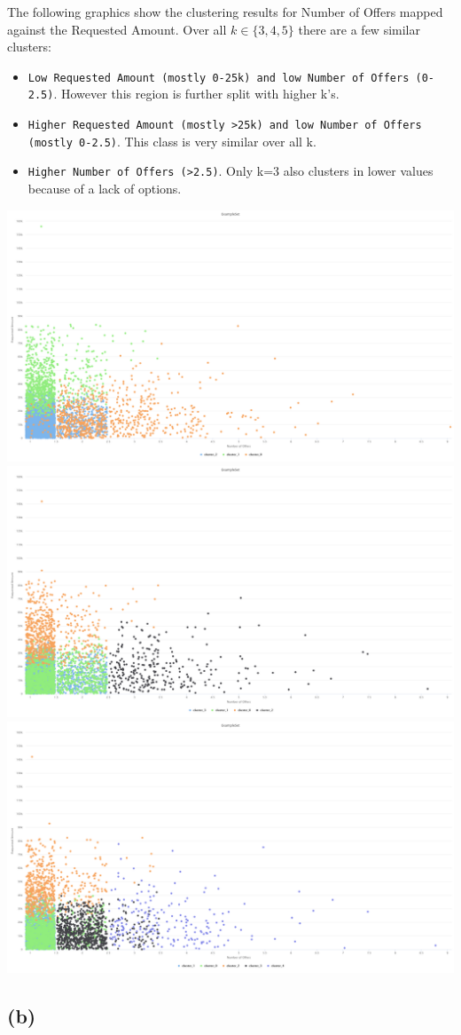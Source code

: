 \documentclass[../../main.tex]{subfiles}
\begin{document}
The following graphics show the clustering results for Number of Offers mapped against the Requested Amount. Over all $k\in\{3,4,5\}$ there are a few similar clusters:
\begin{itemize}
\item \texttt{Low Requested Amount (mostly 0-25k) and low Number of Offers (0-2.5)}. However this region is further split with higher k's.
\item \texttt{Higher Requested Amount (mostly >25k) and low Number of Offers (mostly 0-2.5)}. This class is very similar over all k.
\item \texttt{Higher Number of Offers (>2.5)}. Only k=3 also clusters in lower values because of a lack of options.
\end{itemize}
\includegraphics[width=\textwidth]{img/QUESTION_3a_kmeans_3_offers_amount.png}
\includegraphics[width=\textwidth]{img/QUESTION_3a_kmeans_4_offers_amount.png}
\includegraphics[width=\textwidth]{img/QUESTION_3a_kmeans_5_offers_amount.png}


\subsection*{(b)}
\end{document}

